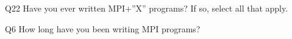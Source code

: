 \begin{description}%
\item{Q22} Have you ever written MPI+”X” programs? If so, select all that apply.%
\item{Q6} How long have you been writing MPI programs?%
\end{description}%
